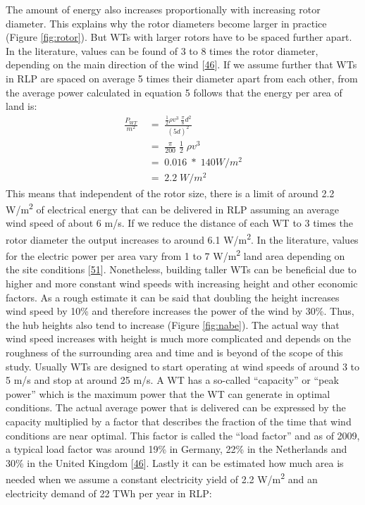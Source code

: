 \documentclass[a4paper,11pt]{article}
\begin{document}
The amount of energy also increases proportionally with increasing rotor diameter. This explains why the rotor diameters become larger in practice (Figure \ref{fig:rotor}). But WTs with larger rotors have to be spaced further apart. In the literature, values can be found of 3 to 8 times the rotor diameter, depending on the main direction of the wind {[}\protect\hyperlink{ref-DavidJCMacKay.2009}{46}{]}. If we assume further that WTs in RLP are spaced on average 5 times their diameter apart from each other, from the average power calculated in equation 5 follows that the energy per area of land is:
\begin{equation}
\begin{split}
\frac{P_{WT}}{m^2}\; & =\; \frac{\frac{1}{2} \rho v^3\; \frac{\pi}{8}d^2}{(5d)^2} \\
 & =\; \frac{\pi}{200}\; \frac{1}{2}\; \rho v^3 \\
 & =\; 0.016\; *\; 140 W/m^2 \\
 & =\; 2.2\; W/m^2
\end{split}
\end{equation}
This means that independent of the rotor size, there is a limit of around 2.2 W/m\textsuperscript{2} of electrical energy that can be delivered in RLP assuming an average wind speed of about 6 m/s. If we reduce the distance of each WT to 3 times the rotor diameter the output increases to around 6.1 W/m\textsuperscript{2}. In the literature, values for the electric power per area vary from 1 to 7 W/m\textsuperscript{2} land area depending on the site conditions {[}\protect\hyperlink{ref-SvenLinow.2020}{51}{]}. Nonetheless, building taller WTs can be beneficial due to higher and more constant wind speeds with increasing height and other economic factors. As a rough estimate it can be said that doubling the height increases wind speed by 10\% and therefore increases the power of the wind by 30\%. Thus, the hub heights also tend to increase (Figure \ref{fig:nabe}). The actual way that wind speed increases with height is much more complicated and depends on the roughness of the surrounding area and time and is beyond of the scope of this study. Usually WTs are designed to start operating at wind speeds of around 3 to 5 m/s and stop at around 25 m/s. A WT has a so-called ``capacity'' or ``peak power'' which is the maximum power that the WT can generate in optimal conditions. The actual average power that is delivered can be expressed by the capacity multiplied by a factor that describes the fraction of the time that wind conditions are near optimal. This factor is called the ``load factor'' and as of 2009, a typical load factor was around 19\% in Germany, 22\% in the Netherlands and 30\% in the United Kingdom {[}\protect\hyperlink{ref-DavidJCMacKay.2009}{46}{]}. Lastly it can be estimated how much area is needed when we assume a constant electricity yield of 2.2 W/m\textsuperscript{2} and an electricity demand of 22 TWh per year in RLP:
\end{document}
